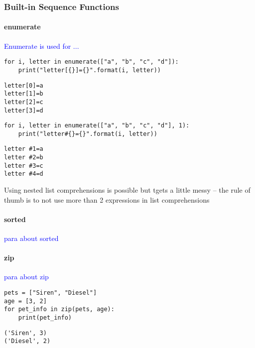 \subsubsection{Built-in Sequence Functions}

\paragraph{enumerate}

\textcolor{blue}{Enumerate is used for ...}

\begin{lstlisting}[style=pyInStyle]
for i, letter in enumerate(["a", "b", "c", "d"]):
    print("letter[{}]={}".format(i, letter))
\end{lstlisting}
\begin{lstlisting}[style=pyOutStyle]
letter[0]=a
letter[1]=b
letter[2]=c
letter[3]=d
\end{lstlisting}


\begin{lstlisting}[style=pyInStyle]
for i, letter in enumerate(["a", "b", "c", "d"], 1):
    print("letter#{}={}".format(i, letter))
\end{lstlisting}
\begin{lstlisting}[style=pyOutStyle]
letter #1=a
letter #2=b
letter #3=c
letter #4=d
\end{lstlisting}
\begin{markdown}
Using nested list comprehensions is possible but tgets a little messy -- the rule of thumb is to not use more than 2 expressions in list comprehensions
\end{markdown}


\paragraph{sorted}

\textcolor{blue}{para about sorted}

\paragraph{zip}

\textcolor{blue}{para about zip}

\begin{lstlisting}[style=pyInStyle]
pets = ["Siren", "Diesel"]
age = [3, 2]
for pet_info in zip(pets, age):
    print(pet_info)
\end{lstlisting}
\begin{lstlisting}[style=pyOutStyle]
('Siren', 3)
('Diesel', 2)
\end{lstlisting}

